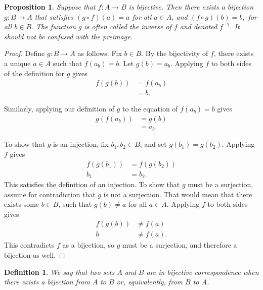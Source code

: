 \documentclass{amsart}
\newtheorem{proposition}[theorem]{Proposition}
\newtheorem{definition}[theorem]{Definition}
\newcommand{\1}{\mathds{1}}
\numberwithin{equation}{section}
\numberwithin{theorem}{section}
\begin{document}
\begin{proposition} 
Suppose that $f \colon A \rightarrow B$ is bijective.  
Then there exists a bijection $g \colon B \rightarrow A$ that satisfies $(g\circ f)(a)=a$ for all $a\in A$, and $(f\circ g)(b)=b,$ for all $b\in B.$ 
The function $g$ is often called the \emph{inverse} of $f$ and  denoted $f^{-1}$. It should not be confused with the preimage. 

\end{proposition}

\begin{proof}
	Define $g:B\to A$ as follows. Fix $b\in B$. By the bijectivity of $f$, there exists a unique $a\in A$ such that $f(a_b)=b$. Let $g(b) = a_b$. Applying $f$ to both sides of the definition for $g$ gives
	\[
	\begin{split}
		f(g(b))&=f(a_b)\\
		&=b.
	\end{split}
	\]
	
	Similarly, applying our definition of $g$ to the equation of $f(a_b)= b$ gives
	\[\begin{split}
		g(f(a_b))&=g(b)\\
		&=a_b.
	\end{split}\]
	
	To show that $g$ is an injection, fix $b_1,b_2\in B$, and set $g(b_1) = g(b_2)$. Applying $f$ gives
	\[\begin{split}
		f(g(b_1))&=f(g(b_2))\\
		b_1&=b_2.
	\end{split}\]
	This satisfies the definition of an injection. To show that $g$ must be a surjection, assume for contradiction that $g$ is not a surjection. That would mean that there exists some $b\in B$, such that $g(b)\not=a$ for all $a\in A$. Applying $f$ to both sides gives
	\[\begin{split}
		f(g(b))&\not=f(a)\\
		b&\not=f(a).
	\end{split}\]
	This contradicts $f$ as a bijection, so $g$ must be a surjection, and therefore a bijection as well.
	
\end{proof}


\begin{definition}
We say that two sets $A$ and $B$ are in \emph{bijective correspondence} when there exists a bijection from $A$ to $B$ or, equivalently, from $B$ to $A$.
\end{definition}
\end{document}
